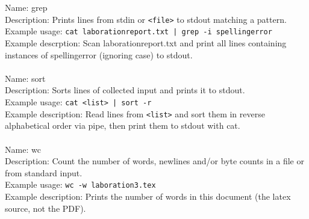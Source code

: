 \documentclass[a4paper,10pt]{article}
\begin{document}
\\
\\
Name: grep
\\
Description: Prints lines from stdin or \verb!<file>! to stdout matching a pattern.
\\
Example usage: \verb!cat laborationreport.txt | grep -i spellingerror!
\\
Example descrption: Scan laborationreport.txt and print all lines containing instances of spellingerror (ignoring case) to stdout.
\\
\\
Name: sort
\\
Description: Sorts lines of collected input and prints it to stdout.
\\
Example usage: \verb!cat <list> | sort -r!
\\
Example description: Read lines from \verb!<list>! and sort them in reverse alphabetical order via pipe, then print them to stdout with cat.
\\
\\
Name: wc
\\
Description: Count the number of words, newlines and/or byte counts in a file or from standard input.
\\
Example usage: \verb!wc -w laboration3.tex!
\\
Example description: Prints the number of words in this document (the latex source, not the PDF).
\\
\\
\end{document}
